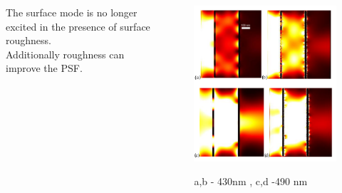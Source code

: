 \documentclass{beamer}
\begin{document}
\begin{frame}
	\begin{columns}
		\begin{column}{0.5\textwidth}
				The surface mode is no longer excited in the presence of surface roughness.\\
				Additionally roughness can improve the PSF.

		\end{column}
		\begin{column}{0.5\textwidth}
			\begin{figure}[htb]
				\includegraphics[width=\textwidth]{../images/multilayer/plp-chropo.png}\\
				\caption{ a,b - 430nm , c,d -490 nm}
			\end{figure}
		\end{column}
	\end{columns}
		
\end{frame}
\end{document}
